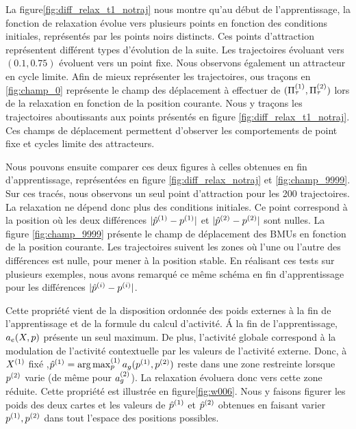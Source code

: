 \documentclass[../main]{subfiles}
\begin{document}
La figure\ref{fig:diff_relax_t1_notraj} nous montre qu'au début de l'apprentissage, la fonction de relaxation évolue vers plusieurs points en fonction des conditions initiales, représentés par les points noirs distincts. 
Ces points d'attraction représentent différent types d'évolution de la suite. Les trajectoires évoluant vers $(0.1, 0.75)$ évoluent vers un point fixe. Nous observons également un attracteur en cycle limite.
Afin de mieux représenter les trajectoires, ous traçons en \ref{fig:champ_0} représente le champ des déplacement à effectuer de $(\Pi^{({1})}_\tau,\Pi^{({2})}_\tau)$ lors de la relaxation en fonction de la position courante. 
Nous y traçons les trajectoires aboutissants aux points présentés en figure \ref{fig:diff_relax_t1_notraj}.
Ces champs de déplacement permettent d'observer les comportements de point fixe et cycles limite des attracteurs.

Nous pouvons ensuite comparer ces deux figures à celles obtenues en fin d'apprentissage, représentées en figure \ref{fig:diff_relax_notraj} et \ref{fig:champ_9999}.
Sur ces tracés, nous observons un seul point d'attraction pour les 200 trajectoires. La relaxation ne dépend donc plus des conditions initiales.
Ce point correspond à la position où les deux différences $\lvert \hat{p}^{({1})} - p^{({1})} \rvert$ et $\lvert \hat{p}^{({2})} - p^{({2})}\rvert$ sont nulles.
La figure \ref{fig:champ_9999} présente le champ de déplacement des BMUs en fonction de la position courante. Les trajectoires suivent les zones où l'une ou l'autre des différences est nulle, pour mener à la position stable. 
En réalisant ces tests sur plusieurs exemples, nous avons remarqué ce  même schéma en fin d'apprentissage pour les différences $\lvert \hat{p}^{({i})} - p^{({i})} \rvert$.

Cette propriété vient de la disposition ordonnée des poids externes à la fin de l'apprentissage et de la formule du calcul d'activité.
\'A la fin de l'apprentissage, $a_e(X,p)$ présente un seul maximum. 
De plus, l'activité globale correspond à la modulation de l'activité contextuelle par les valeurs de l'activité externe. Donc, à $X^{({1})}$ fixé ,$\hat{p}^{({1})} = \operatorname*{arg\,max}_p^{({1})} a_g(p^{({1})}, p^{({2})})$ reste dans une zone restreinte lorsque $p^{({2})}$ varie (de même pour $a_g^{({2})}$). 
La relaxation évoluera donc vers cette zone réduite.
Cette propriété est illustrée en figure\ref{fig:w006}.
Nous y faisons figurer les poids des deux cartes et les valeurs de $\hat{p}^{({1})}$ et $\hat{p}^{({2})}$ obtenues en faisant varier $p^{({1})}, p^{({2})}$ dans tout l'espace des positions possibles.
\end{document}

